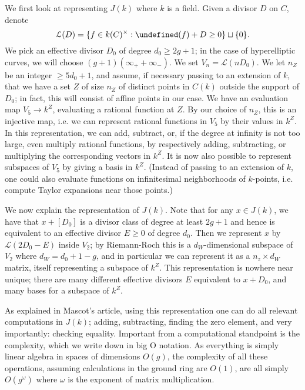 \documentclass[12pt]{article}
\newcommand{\Lcal}{\mathcal{L}}
\let\div\undefined
\DeclareMathOperator{\div}{div}
\theoremstyle{plain}
\theoremstyle{definition}
\theoremstyle{remark}
\begin{document}
We first look at representing $J(k)$ where $k$ is a field. Given a divisor $D$ on $C$, denote
\[
\Lcal(D) = \{f \in k(C)^\times : \div(f) + D \geq 0 \} \sqcup \{0\}.
\]
We pick an effective divisor $D_0$ of degree $d_0 \geq 2g+1$; in the case of hyperelliptic curves, we will choose $(g+1)(\infty_+ + \infty_-)$. We set $V_n = \Lcal(nD_0)$. We let $n_Z$ be an integer $\geq 5d_0 + 1$, and assume, if necessary passing to an extension of $k$, that we have a set $Z$ of size $n_Z$ of distinct points in $C(k)$ outside the support of $D_0$; in fact, this will consist of affine points in our case. We have an evaluation map $V_5 \to k^Z$, evaluating a rational function at $Z$. By our choice of $n_Z$, this is an injective map, i.e. we can represent rational functions in $V_5$ by their values in $k^Z$. In this representation, we can add, subtract, or, if the degree at infinity is not too large, even multiply rational functions, by respectively adding, subtracting, or multiplying the corresponding vectors in $k^Z$. It is now also possible to represent subspaces of $V_5$ by giving a basis in $k^Z$. (Instead of passing to an extension of $k$, one could also evaluate functions on infinitesimal neighborhoods of $k$-points, i.e. compute Taylor expansions near those points.)

We now explain the representation of $J(k)$. Note that for any $x \in J(k)$, we have that $x + [D_0]$ is a divisor class of degree at least $2g+1$ and hence is equivalent to an effective divisor $E \geq 0$ of degree $d_0$. Then we represent $x$ by $\Lcal(2D_0 - E)$ inside $V_2$; by Riemann-Roch this is a $d_W$-dimensional subspace of $V_2$ where $d_W = d_0 + 1 - g$, and in particular we can represent it as a $n_z \times d_W$ matrix, itself representing a subspace of $k^Z$. This representation is nowhere near unique; there are many different effective divisors $E$ equivalent to $x + D_0$, and many bases for a subspace of $k^Z$.

As explained in Mascot's article, using this representation one can do all relevant computations in $J(k)$; adding, subtracting, finding the zero element, and very importantly: checking equality. Important from a computational standpoint is the complexity, which we write down in big O notation. As everything is simply linear algebra in spaces of dimensions $O(g)$, the complexity of all these operations, assuming calculations in the ground ring are $O(1)$, are all simply $O(g^\omega)$ where $\omega$ is the exponent of matrix multiplication.
\end{document}
